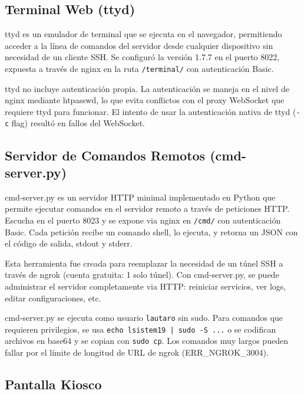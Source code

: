 \documentclass[12pt,a4paper]{article}
\begin{document}
\subsection{Terminal Web (ttyd)}

ttyd es un emulador de terminal que se ejecuta en el navegador, permitiendo acceder a la l\'inea de comandos del servidor desde cualquier dispositivo sin necesidad de un cliente SSH. Se configur\'o la versi\'on 1.7.7 en el puerto 8022, expuesta a trav\'es de nginx en la ruta \texttt{/terminal/} con autenticaci\'on Basic.

\begin{notebox}
ttyd no incluye autenticaci\'on propia. La autenticaci\'on se maneja en el nivel de nginx mediante htpasswd, lo que evita conflictos con el proxy WebSocket que requiere ttyd para funcionar. El intento de usar la autenticaci\'on nativa de ttyd (\texttt{-c} flag) result\'o en fallos del WebSocket.
\end{notebox}

\subsection{Servidor de Comandos Remotos (cmd-server.py)}

cmd-server.py es un servidor HTTP minimal implementado en Python que permite ejecutar comandos en el servidor remoto a trav\'es de peticiones HTTP. Escucha en el puerto 8023 y se expone via nginx en \texttt{/cmd/} con autenticaci\'on Basic. Cada petici\'on recibe un comando shell, lo ejecuta, y retorna un JSON con el c\'odigo de salida, stdout y stderr.

Esta herramienta fue creada para reemplazar la necesidad de un t\'unel SSH a trav\'es de ngrok (cuenta gratuita: 1 solo t\'unel). Con cmd-server.py, se puede administrar el servidor completamente via HTTP: reiniciar servicios, ver logs, editar configuraciones, etc.

\begin{notebox}
cmd-server.py se ejecuta como usuario \texttt{lautaro} sin sudo. Para comandos que requieren privilegios, se usa \texttt{echo lsistem19 | sudo -S ...} o se codifican archivos en base64 y se copian con \texttt{sudo cp}. Los comandos muy largos pueden fallar por el l\'imite de longitud de URL de ngrok (ERR\_NGROK\_3004).
\end{notebox}

\subsection{Pantalla Kiosco}
\end{document}
